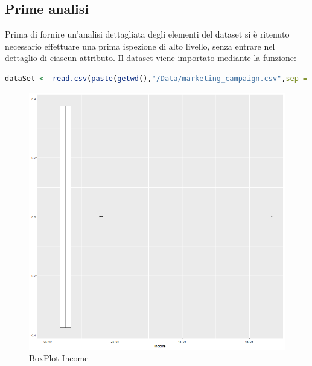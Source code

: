 \documentclass[letterpaper,11pt]{article}
\begin{document}
\subsection{Prime analisi}
Prima di fornire un'analisi dettagliata degli elementi del dataset si è ritenuto necessario effettuare una prima ispezione di alto livello, senza entrare nel dettaglio di ciascun attributo. Il dataset viene importato mediante la funzione:
\begin{lstlisting}[language=R]
dataSet <- read.csv(paste(getwd(),"/Data/marketing_campaign.csv",sep = ""), header=TRUE, sep="\t",  stringsAsFactors=F) # use TAB as separator!
\end{lstlisting}

\begin{figure}[H]
  \centering
  \begin{minipage}[b]{0.4\textwidth}
    \includegraphics[width=\textwidth]{Img/DESCRIPTION/DESCRIPTION003.png}
    \caption{BoxPlot Income}
    \label{fig:BoxPlotIncome}
  \end{minipage}
  \hfill
  \begin{minipage}[b]{0.4\textwidth}

\end{minipage}
\end{figure}
\end{document}
